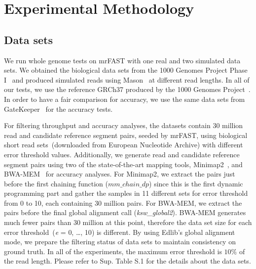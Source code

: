 \section{Experimental Methodology}
\subsection{Data sets} 
We run whole genome tests on mrFAST with one real and two simulated data sets. We obtained the biological data sets from the 1000 Genomes Project Phase I~\cite{10002012integrated} and produced simulated reads using Mason~\cite{holtgrewe2010mason} at different read lengths. In all of our tests, we use the reference GRCh37 produced by the 1000 Genomes Project~\cite{10002015global}. In order to have a fair comparison for accuracy, we use the same data sets from GateKeeper~\cite{Alser2017} for the accuracy tests. 

For filtering throughput and accuracy analyses, the datasets contain 30 million read and candidate reference segment pairs, seeded by mrFAST, using biological short read sets~(downloaded from European Nucleotide Archive) with different error threshold values. Additionally, we generate read and candidate reference segment pairs using two of the state-of-the-art mapping tools, Minimap2~\cite{li2018minimap2}, and BWA-MEM~\cite{li2013aligning} for accuracy analyses. For Minimap2, we extract the pairs just before the first chaining function ($mm\_chain\_dp$) since this is the first dynamic programming part and gather the samples in 11 different sets for error threshold from 0 to 10, each containing 30 million pairs. For BWA-MEM, we extract the pairs before the final global alignment call (\textit{ksw\_global2}). BWA-MEM generates much fewer pairs than 30 million at this point, therefore the data set size for each error threshold~(\textit{e} = {0, \ldots, 10}) is different.  
By using Edlib's global alignment mode, we prepare the filtering status of data sets to maintain consistency on ground truth. In all of the experiments, the maximum error threshold is $10\%$ of the read length. Please refer to Sup. Table S.1 for the details about the data sets.
